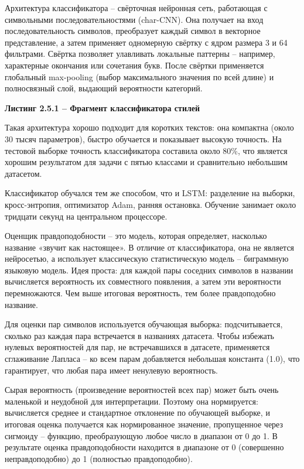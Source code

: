 Архитектура классификатора -- свёрточная нейронная сеть, работающая с символьными последовательностями (char-CNN). Она получает на вход последовательность символов, преобразует каждый символ в векторное представление, а затем применяет одномерную свёртку с ядром размера 3 и 64 фильтрами. Свёртка позволяет улавливать локальные паттерны -- например, характерные окончания или сочетания букв. После свёртки применяется глобальный max-pooling (выбор максимального значения по всей длине) и полносвязный слой, выдающий вероятности категорий.

\textbf{Листинг 2.5.1 -- Фрагмент классификатора стилей}



Такая архитектура хорошо подходит для коротких текстов: она компактна (около 30 тысяч параметров), быстро обучается и показывает высокую точность. На тестовой выборке точность классификатора составила около 80\%, что является хорошим результатом для задачи с пятью классами и сравнительно небольшим датасетом.

Классификатор обучался тем же способом, что и LSTM: разделение на выборки, кросс-энтропия, оптимизатор Adam, ранняя остановка. Обучение занимает около тридцати секунд на центральном процессоре.

Оценщик правдоподобности -- это модель, которая определяет, насколько название «звучит как настоящее». В отличие от классификатора, она не является нейросетью, а использует классическую статистическую модель -- биграммную языковую модель. Идея проста: для каждой пары соседних символов в названии вычисляется вероятность их совместного появления, а затем эти вероятности перемножаются. Чем выше итоговая вероятность, тем более правдоподобно название.

Для оценки пар символов используется обучающая выборка: подсчитывается, сколько раз каждая пара встречается в названиях датасета. Чтобы избежать нулевых вероятностей для пар, не встречавшихся в датасете, применяется сглаживание Лапласа -- ко всем парам добавляется небольшая константа (1.0), что гарантирует, что любая пара имеет ненулевую вероятность.

Сырая вероятность (произведение вероятностей всех пар) может быть очень маленькой и неудобной для интерпретации. Поэтому она нормируется: вычисляется среднее и стандартное отклонение по обучающей выборке, и итоговая оценка получается как нормированное значение, пропущенное через сигмоиду -- функцию, преобразующую любое число в диапазон от 0 до 1. В результате оценка правдоподобности находится в диапазоне от 0 (совершенно неправдоподобно) до 1 (полностью правдоподобно).

